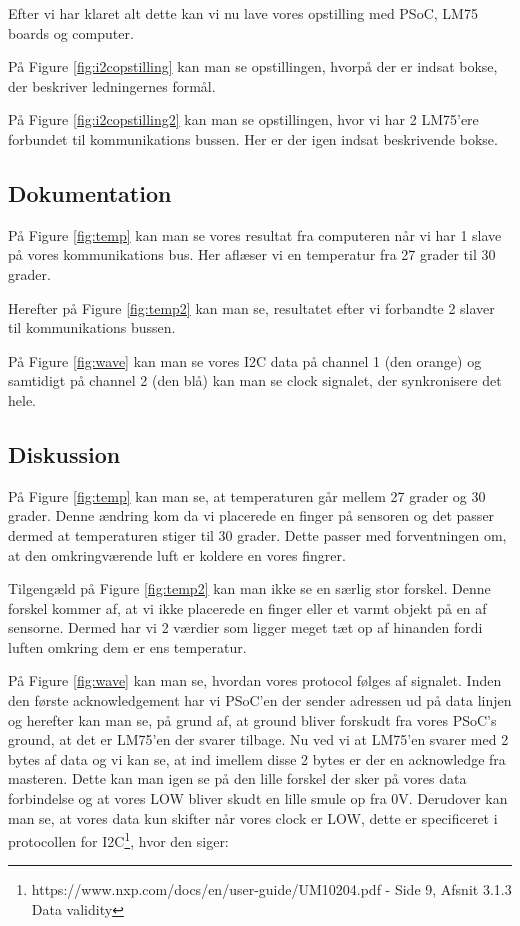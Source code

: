 \documentclass[../main.tex]{subfiles}
\begin{document}
Efter vi har klaret alt dette kan vi nu lave vores opstilling med PSoC, LM75 boards og computer.

På Figure \ref{fig:i2copstilling} kan man se opstillingen, hvorpå der er indsat bokse, der beskriver ledningernes formål.


På Figure \ref{fig:i2copstilling2} kan man se opstillingen, hvor vi har 2 LM75'ere forbundet til kommunikations bussen. Her er der igen indsat beskrivende bokse.

\subsection{Dokumentation}

På Figure \ref{fig:temp} kan man se vores resultat fra computeren når vi har 1 slave på vores kommunikations bus. Her aflæser vi en temperatur fra 27 grader til 30 grader.

Herefter på Figure \ref{fig:temp2} kan man se, resultatet efter vi forbandte 2 slaver til kommunikations bussen.

På Figure \ref{fig:wave} kan man se vores I2C data på channel 1 (den orange) og samtidigt på channel 2 (den blå) kan man se clock signalet, der synkronisere det hele.


\subsection{Diskussion}
På Figure \ref{fig:temp} kan man se, at temperaturen går mellem 27 grader og 30 grader. Denne ændring kom da vi placerede en finger på sensoren og det passer dermed at temperaturen stiger til 30 grader.
Dette passer med forventningen om, at den omkringværende luft er koldere en vores fingrer.

Tilgengæld på Figure \ref{fig:temp2} kan man ikke se en særlig stor forskel. Denne forskel kommer af, at vi ikke placerede en finger eller et varmt objekt på en af sensorne. 
Dermed har vi 2 værdier som ligger meget tæt op af hinanden fordi luften omkring dem er ens temperatur.

På Figure \ref{fig:wave} kan man se, hvordan vores protocol følges af signalet. 
Inden den første acknowledgement har vi PSoC'en der sender adressen ud på data linjen og herefter kan man se, på grund af, at ground bliver forskudt fra vores PSoC's ground, at det er LM75'en der svarer tilbage.
Nu ved vi at LM75'en svarer med 2 bytes af data og vi kan se, at ind imellem disse 2 bytes er der en acknowledge fra masteren. Dette kan man igen se på den lille forskel der sker på vores data forbindelse og at vores LOW bliver skudt en lille smule op fra 0V.
Derudover kan man se, at vores data kun skifter når vores clock er LOW, dette er specificeret i protocollen for I2C\footnote{https://www.nxp.com/docs/en/user-guide/UM10204.pdf - Side 9, Afsnit 3.1.3 Data validity}, hvor den siger:
\end{document}
